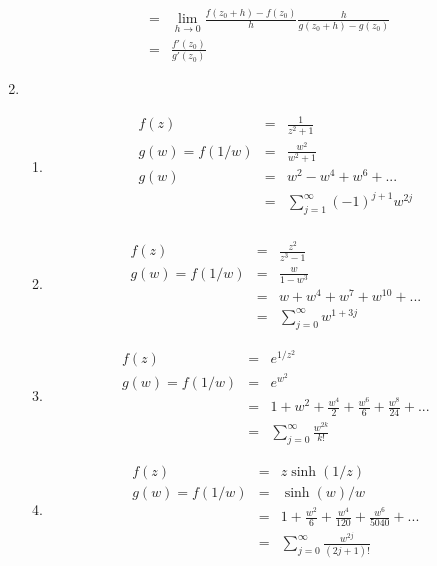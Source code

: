 \documentclass{article}%
\begin{document}
\begin{enumerate}
\begin{eqnarray*}
                                            &=& \lim_{h \to 0}{\frac{f(z_0+h)-f(z_0)}{h} \frac{h}{g(z_0+h)-g(z_0)}} \\
                                            &=& \frac{f'(z_0)}{g'(z_0)}
    \end{eqnarray*}
    \setcounter{enumi}{0}
    \item %
    \begin{enumerate}[label=(\alph*)]
        \item %
        \begin{eqnarray*}
            f(z) &=& \frac{1}{z^2+1} \\
            g(w) = f(1/w) &=& \frac{w^2}{w^2+1} \\
            g(w) &=& w^2 - w^4 + w^6 + ... \\
                 &=& \sum\limits_{j=1}^{\infty}{(-1)^{j+1}w^{2j}} \\
        \end{eqnarray*}
        \item %
        \begin{eqnarray*}
            f(z) &=& \frac{z^2}{z^3-1} \\
            g(w) = f(1/w) &=& \frac{w}{1-w^3} \\
                 &=& w + w^4 + w^7 + w^10 + ... \\
                 &=& \sum\limits_{j=0}^{\infty}{w^{1+3j}}
        \end{eqnarray*}
        \item %
        \begin{eqnarray*}
            f(z) &=& e^{1/z^2} \\
            g(w) = f(1/w) &=& e^{w^2} \\
                &=& 1 + w^2 + \frac{w^4}{2} + \frac{w^6}{6} + \frac{w^8}{24} + ... \\
                &=& \sum\limits_{j=0}^{\infty}{\frac{w^{2k}}{k!}}
        \end{eqnarray*}
        \item %
        \begin{eqnarray*}
            f(z) &=& z \sinh(1/z) \\
            g(w) = f(1/w) &=& \sinh(w)/w \\
                &=& 1 + \frac{w^2}{6} + \frac{w^4}{120} + \frac{w^6}{5040} + ... \\
                &=& \sum\limits_{j=0}^{\infty}{\frac{w^{2j}}{(2j+1)!}}
        \end{eqnarray*}
    \end{enumerate}

\end{enumerate}
\end{document}
